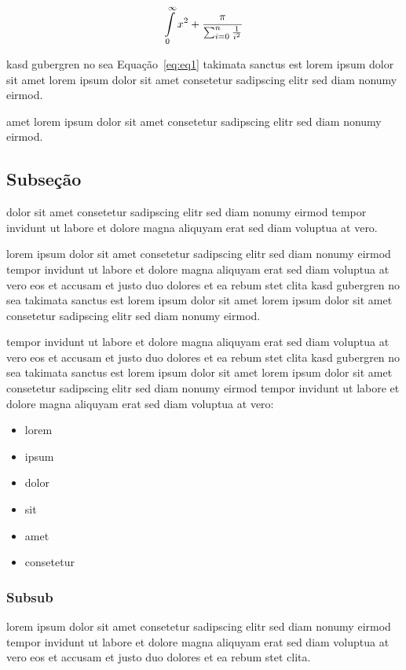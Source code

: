 \documentclass[sigconf]{acmart}
\begin{document}
\begin{equation}\label{eq:eq1}
    \intop_{0}^{\infty}{x^2 + \frac{\pi}{\sum_{i=0}^{n}{\frac{1}{i^2}}}}
\end{equation}

kasd gubergren no sea Equação~\eqref{eq:eq1} takimata sanctus est
lorem ipsum dolor sit amet lorem ipsum dolor sit amet consetetur
sadipscing elitr sed diam nonumy eirmod.~\cite{PICCOLIAPL11}

amet lorem ipsum dolor sit amet consetetur sadipscing elitr sed
diam nonumy eirmod.~\cite{PICCOLIDM08}

\subsection{Subseção}

dolor sit amet consetetur sadipscing elitr sed diam nonumy eirmod
tempor invidunt ut labore et dolore magna aliquyam erat sed diam
voluptua at vero.

lorem ipsum dolor sit amet consetetur sadipscing elitr sed diam
nonumy eirmod tempor invidunt ut labore et dolore magna aliquyam
erat sed diam voluptua at vero eos et accusam et justo duo dolores
et ea rebum stet clita kasd gubergren no sea takimata sanctus est
lorem ipsum dolor sit amet lorem ipsum dolor sit amet consetetur
sadipscing elitr sed diam nonumy eirmod.

tempor invidunt ut labore et dolore magna aliquyam erat sed diam voluptua at
vero eos et accusam et justo duo dolores et ea rebum stet clita kasd
gubergren no sea takimata sanctus est lorem ipsum dolor sit amet lorem ipsum
dolor sit amet consetetur sadipscing elitr sed diam nonumy eirmod tempor
invidunt ut labore et dolore magna aliquyam erat sed diam voluptua
at vero:

\begin{itemize}
   \item lorem
   \item ipsum
   \item dolor
   \item sit
   \item amet
   \item consetetur
\end{itemize}

\subsubsection{Subsub}

lorem ipsum dolor sit amet consetetur sadipscing elitr sed diam nonumy
eirmod tempor invidunt ut labore et dolore magna aliquyam erat sed diam
voluptua at vero eos et accusam et justo duo dolores et ea rebum
stet clita.~\cite{GOLDENBERGAPL02}
\end{document}
